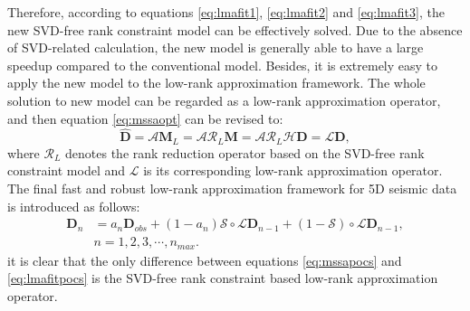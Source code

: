 Therefore, according to equations \ref{eq:lmafit1}, \ref{eq:lmafit2} and \ref{eq:lmafit3}, the new SVD-free rank constraint model can be effectively solved.  Due to the absence of SVD-related calculation, the new model is generally able to have a large speedup compared to the conventional model. Besides, it is extremely easy to apply the new model to the low-rank approximation framework. The whole solution to new model can be regarded as a low-rank approximation operator, and then equation \ref{eq:mssaopt} can be revised to:
\begin{equation}
\label{eq:lmafitopt}
\hat{\mathbf{D}}=\mathcal{A}\mathbf{M}_{L}=\mathcal{A}\mathcal{R}_L\mathbf{M}=
\mathcal{A}\mathcal{R}_L\mathcal{H}\mathbf{D}=\mathcal{L}\mathbf{D},
\end{equation}
where $\mathcal{R}_L$ denotes the rank reduction operator based on the SVD-free rank constraint model and $\mathcal{L}$ is its corresponding low-rank approximation operator. The final fast and robust low-rank approximation framework for 5D seismic data is introduced as follows:
\begin{equation}
\label{eq:lmafitpocs}
\begin{split}
\mathbf{D}_n&=a_n \mathbf{D}_{obs} + (1-a_n) \mathcal{S}\circ \mathcal{L} \mathbf{D}_{n-1} + (1-\mathcal{S})\circ \mathcal{L}\mathbf{D}_{n-1},\\
& n=1,2,3,\cdots,n_{max}.
\end{split}
\end{equation} 
 it is clear that the only difference between equations \ref{eq:mssapocs} and \ref{eq:lmafitpocs} is the SVD-free rank constraint based low-rank approximation operator.


